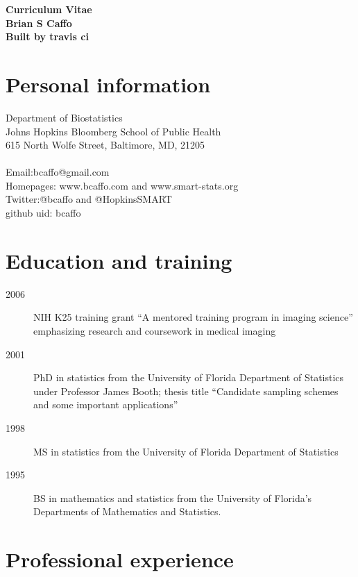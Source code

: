 \documentclass[12pt]{article}
\begin{document}
{ \vspace{-.5in}
\begin{center}
\large
\bf Curriculum Vitae\\
Brian S Caffo \\
Built by travis ci
\end{center}
}

\section*{Personal information}
Department of Biostatistics\\
Johns Hopkins Bloomberg School of Public Health \\ 
615 North Wolfe Street, Baltimore, MD, 21205 \\ \\
Email:bcaffo@gmail.com \\
Homepages: www.bcaffo.com and www.smart-stats.org \\
Twitter:@bcaffo and @HopkinsSMART \\
github uid: bcaffo

\section*{Education and training}
\begin{description}
\item[\textnormal{2006}] NIH K25 training grant ``A mentored training program in imaging science'' emphasizing research and coursework in medical imaging
\item[\textnormal{2001}] PhD in statistics from the University of Florida Department of Statistics under Professor James Booth; thesis title ``Candidate sampling schemes and some important applications''
\item[\textnormal{1998}] MS in statistics from the University of Florida Department of Statistics
\item[\textnormal{1995}] BS in mathematics and statistics from the University of Florida's Departments of Mathematics and Statistics.
\end{description}


\section*{Professional experience}
\end{document}
